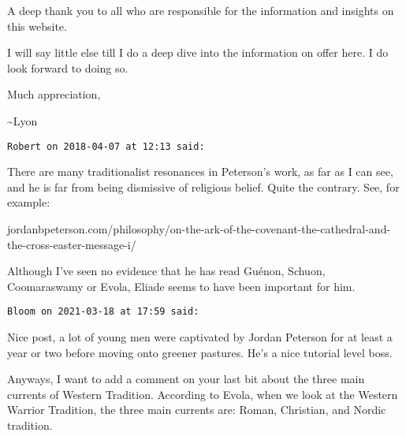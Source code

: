 \begin{footnotesize}
\begin{sffamily}
A deep thank you to all who are responsible for the information and insights on this website. 

I will say little else till I do a deep dive into the information on offer here. I do look forward to doing so. 

Much appreciation,

\~{}Lyon


\hfill

\texttt{Robert on 2018-04-07 at 12:13 said: }

There are many traditionalist resonances in Peterson's work, as far as I can see, and he is far from being dismissive of religious belief. Quite the contrary. See, for example:

jordanbpeterson.com/philosophy/on-the-ark-of-the-covenant-the-cathedral-and-the-cross-easter-message-i/

Although I've seen no evidence that he has read Guénon, Schuon, Coomaraswamy or Evola, Eliade seems to have been important for him.


\hfill

\texttt{Bloom on 2021-03-18 at 17:59 said: }

Nice post, a lot of young men were captivated by Jordan Peterson for at least a year or two before moving onto greener pastures. He's a nice tutorial level boss.

Anyways, I want to add a comment on your last bit about the three main currents of Western Tradition. According to Evola, when we look at the Western Warrior Tradition, the three main currents are: Roman, Christian, and Nordic tradition.


\hfill


\end{sffamily}\end{footnotesize}
